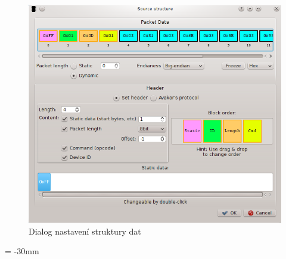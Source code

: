\documentclass[12pt, a4paper, oneside]{article}
\begin{document}
\begin{figure}[H]
\begin{center}
\includegraphics[scale=0.65]{img/analyzer_struct.png}
\caption{Dialog nastavení struktury dat}
\label{Analyzer_struct}
\end{center}
\end{figure}

\addtolength{\textheight}{30mm}
\newpage
\voffset = -30mm %
\enlargethispage{60mm} %
\end{document}
